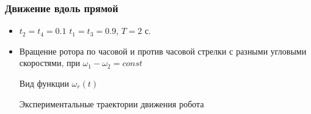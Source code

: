 \begin{frame}
\frametitle{Движение вдоль прямой}
\begin{itemize}
	\item $ t_2=t_4=0.1 $ $ t_1=t_3=0.9 $, $T = 2$ с.
	\item Вращение ротора по часовой и против часовой стрелки с разными угловыми скоростями, при $ \omega_1 - \omega_2 = const$
	
	\begin{minipage}[h]{0.47\linewidth}
		Вид функции $ \omega_r(t) $ \\
	\end{minipage}
	\hfill
	\begin{minipage}[h]{0.47\linewidth}
		Экспериментальные траектории движения робота
	\end{minipage}
	
	
\end{itemize}


\end{frame}


%


%	


